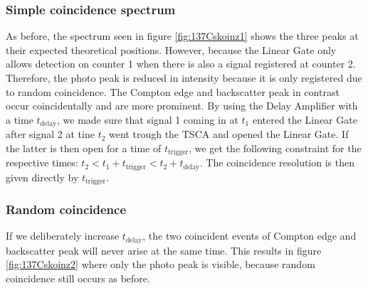 \subsubsection*{Simple coincidence spectrum}
%
As before, the spectrum seen in figure \ref{fig:137Cskoinz1} shows the three peaks at their expected theoretical positions.
However, because the Linear Gate only allows detection on counter 1 when there is also a signal registered at counter 2.
Therefore, the photo peak is reduced in intensity because it is only registered due to random coincidence.
The Compton edge and backscatter peak in contrast occur coincidentally and are more prominent.
By using the Delay Amplifier with a time $t_{\text{delay}}$, we made sure that signal 1 coming in at $t_1$ entered the Linear Gate after signal 2 at tine $t_2$ went trough the TSCA and opened the Linear Gate.
If the latter is then open for a time of $t_{\text{trigger}}$, we get the following constraint for the respective times: $t_2 < t_1 + t_{\text{trigger}} < t_2 +  t_{\text{delay}}$.
The coincidence resolution is then given directly by $t_{\text{trigger}}$.
%
\subsubsection*{Random coincidence}
%
If we deliberately increase $t_{\text{delay}}$, the two coincident events of Compton edge and backscatter peak will never arise at the same time.
This results in figure \ref{fig:137Cskoinz2} where only the photo peak is visible, because random coincidence still occurs as before.
%
